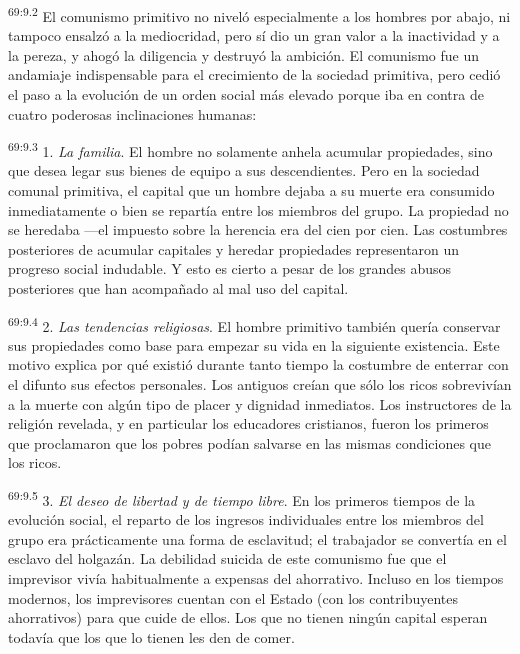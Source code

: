 \documentclass[twoside, 11pt]{book}
\begin{document}
\par
\textsuperscript{69:9.2} El comunismo primitivo no niveló especialmente a los hombres por abajo, ni tampoco ensalzó a la mediocridad, pero sí dio un gran valor a la inactividad y a la pereza, y ahogó la diligencia y destruyó la ambición. El comunismo fue un andamiaje indispensable para el crecimiento de la sociedad primitiva, pero cedió el paso a la evolución de un orden social más elevado porque iba en contra de cuatro poderosas inclinaciones humanas:

\par
\textsuperscript{69:9.3} 1. \textit{La familia}. El hombre no solamente anhela acumular propiedades, sino que desea legar sus bienes de equipo a sus descendientes. Pero en la sociedad comunal primitiva, el capital que un hombre dejaba a su muerte era consumido inmediatamente o bien se repartía entre los miembros del grupo. La propiedad no se heredaba ---el impuesto sobre la herencia era del cien por cien. Las costumbres posteriores de acumular capitales y heredar propiedades representaron un progreso social indudable. Y esto es cierto a pesar de los grandes abusos posteriores que han acompañado al mal uso del capital.

\par
\textsuperscript{69:9.4} 2. \textit{Las tendencias religiosas}. El hombre primitivo también quería conservar sus propiedades como base para empezar su vida en la siguiente existencia. Este motivo explica por qué existió durante tanto tiempo la costumbre de enterrar con el difunto sus efectos personales. Los antiguos creían que sólo los ricos sobrevivían a la muerte con algún tipo de placer y dignidad inmediatos. Los instructores de la religión revelada, y en particular los educadores cristianos, fueron los primeros que proclamaron que los pobres podían salvarse en las mismas condiciones que los ricos.

\par
\textsuperscript{69:9.5} 3. \textit{El deseo de libertad y de tiempo libre}. En los primeros tiempos de la evolución social, el reparto de los ingresos individuales entre los miembros del grupo era prácticamente una forma de esclavitud; el trabajador se convertía en el esclavo del holgazán. La debilidad suicida de este comunismo fue que el imprevisor vivía habitualmente a expensas del ahorrativo. Incluso en los tiempos modernos, los imprevisores cuentan con el Estado (con los contribuyentes ahorrativos) para que cuide de ellos. Los que no tienen ningún capital esperan todavía que los que lo tienen les den de comer.
\end{document}
